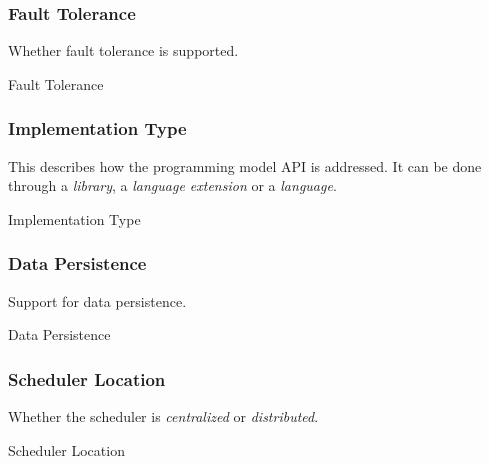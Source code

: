 \subsubsection{Fault Tolerance}
Whether fault tolerance is supported.
\begin{table}[H]
	\caption{Fault Tolerance}
	\centering
	\begin{multicols}{2}
		

		
	\end{multicols}
\end{table}

\subsubsection{Implementation Type}
This describes how the programming model API is addressed.
It can be done through a \textit{library}, a \textit{language extension} or a \textit{language}.
\begin{table}[H]
	\caption{Implementation Type}
	\centering
	\begin{multicols}{2}
		

		
	\end{multicols}
\end{table}

\subsubsection{Data Persistence}
Support for data persistence.
\begin{table}[H]
	\caption{Data Persistence}
	\centering
	\begin{multicols}{2}
		

		
	\end{multicols}
\end{table}

\subsubsection{Scheduler Location}
Whether the scheduler is \textit{centralized} or \textit{distributed}.
\begin{table}[H]
	\caption{Scheduler Location}
	\centering
	\begin{multicols}{2}
		

		
	\end{multicols}
\end{table}

